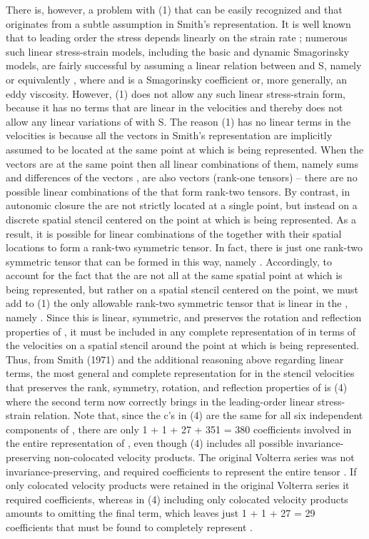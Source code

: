 There is, however, a problem with (1) that can be easily recognized and that originates from a subtle assumption in Smith’s representation.  It is well known that to leading order the stress   depends linearly on the strain rate  ; numerous such linear stress-strain models, including the basic and dynamic Smagorinsky models, are fairly successful by assuming a linear relation between   and S, namely   or equivalently  , where   and   is a Smagorinsky coefficient or, more generally, an eddy viscosity.  However, (1) does not allow any such linear stress-strain form, because it has no terms that are linear in the velocities   and thereby does not allow any linear variations of   with S.
The reason (1) has no linear terms in the velocities   is because all the vectors   in Smith’s representation are implicitly assumed to be located at the same point at which   is being represented. When the vectors   are at the same point then all linear combinations of them, namely sums and differences of the vectors  , are also vectors (rank-one tensors) – there are no possible linear combinations of the   that form rank-two tensors.
By contrast, in autonomic closure the   are not strictly located at a single point, but instead on a discrete spatial stencil centered on the point at which   is being represented.  As a result, it is possible for linear combinations of the   together with their spatial locations to form a rank-two symmetric tensor. In fact, there is just one rank-two symmetric tensor that can be formed in this way, namely  .
Accordingly, to account for the fact that the   are not all at the same spatial point at which   is being represented, but rather on a spatial stencil centered on the point, we must add to (1) the only allowable rank-two symmetric tensor that is linear in the  , namely  . Since this is linear, symmetric, and preserves the rotation and reflection properties of  , it must be included in any complete representation of   in terms of the velocities   on a spatial stencil around the point at which   is being represented.
Thus, from Smith (1971) and the additional reasoning above regarding linear terms, the most general and complete representation for   in the stencil velocities   that preserves the rank, symmetry, rotation, and reflection properties of   is 
       (4)
where the second term now correctly brings in the leading-order linear stress-strain relation. 
Note that, since the c’s in (4) are the same for all six independent components of  , there are only 1 + 1 + 27 + 351 = 380 coefficients involved in the entire representation of  , even though (4) includes all possible invariance-preserving non-colocated velocity products. The original Volterra series was not invariance-preserving, and required   coefficients to represent the entire tensor  . If only colocated velocity products were retained in the original Volterra series it required   coefficients, whereas in (4) including only colocated velocity products amounts to omitting the final term, which leaves just 1 + 1 + 27 = 29 coefficients that must be found to completely represent  . 
